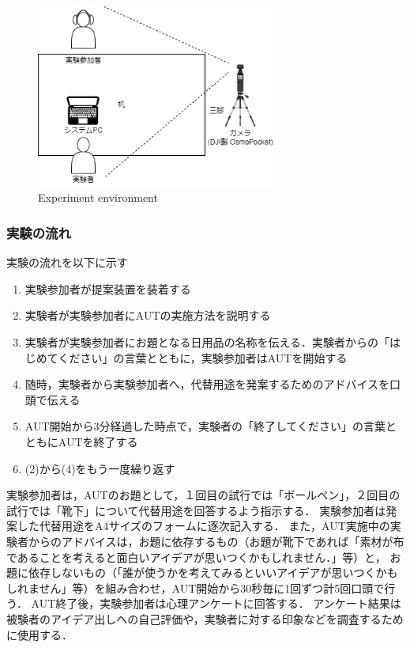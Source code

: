 \documentclass[a4paper]{jarticle}
\begin{document}
\begin{figure}[htbp]
    \begin{center}
    \includegraphics[width=80mm]{configuration.jpg}
    \caption{Experiment environment}
    \label{fig:env}
    \end{center}
    \end{figure}
\subsubsection{実験の流れ}
実験の流れを以下に示す
\begin{enumerate}
    \item 実験参加者が提案装置を装着する
    \item 実験者が実験参加者にAUTの実施方法を説明する
    \item 実験者が実験参加者にお題となる日用品の名称を伝える．実験者からの「はじめてください」の言葉とともに，実験参加者はAUTを開始する
    \item 随時，実験者から実験参加者へ，代替用途を発案するためのアドバイスを口頭で伝える
    \item AUT開始から3分経過した時点で，実験者の「終了してください」の言葉とともにAUTを終了する
    \item (2)から(4)をもう一度繰り返す
\end{enumerate}
実験参加者は，AUTのお題として，１回目の試行では「ボールペン」，２回目の試行では「靴下」について代替用途を回答するよう指示する．
実験参加者は発案した代替用途をA4サイズのフォームに逐次記入する．
また，AUT実施中の実験者からのアドバイスは，お題に依存するもの（お題が靴下であれば「素材が布であることを考えると面白いアイデアが思いつくかもしれません．」等）と，
お題に依存しないもの（「誰が使うかを考えてみるといいアイデアが思いつくかもしれません」等）を組み合わせ，AUT開始から30秒毎に1回ずつ計5回口頭で行う．
AUT終了後，実験参加者は心理アンケートに回答する．
アンケート結果は被験者のアイデア出しへの自己評価や，実験者に対する印象などを調査するために使用する．
\end{document}
